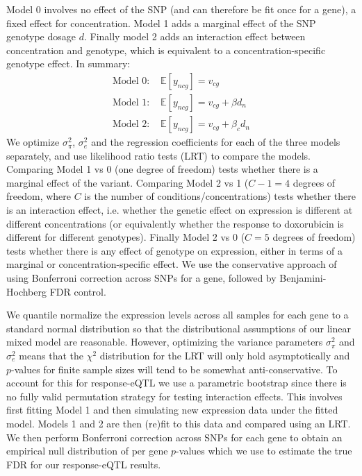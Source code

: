 \documentclass{article}
\begin{document}
{Model 0 involves no effect of the SNP (and can therefore be fit once for a gene), a fixed effect for concentration. Model 1 adds a marginal effect of the SNP genotype dosage $d$. Finally model 2 adds an interaction effect between concentration and genotype, which is equivalent to a concentration-specific genotype effect. In summary: 
\begin{align}
\text{Model 0: }& \mathbb{E}[ y_{ncg} ] = v_{cg} \\ 
\text{Model 1: }& \mathbb{E}[ y_{ncg} ] = v_{cg} + \beta d_n \\
\text{Model 2: }& \mathbb{E}[ y_{ncg} ] = v_{cg} + \beta_c d_n \label{eq:betac}
\end{align}
We optimize $\sigma^2_\pi$, $\sigma^2_e$ and the regression coefficients for each of the three models separately, and use likelihood ratio tests (LRT) to compare the models. Comparing Model 1 vs 0 (one degree of freedom) tests whether there is a marginal effect of the variant. Comparing Model 2 vs 1 ($C-1=4$ degrees of freedom, where $C$ is the number of conditions/concentrations) tests whether there is an interaction effect, i.e. whether the genetic effect on expression is different at different concentrations (or equivalently whether the response to doxorubicin is different for different genotypes). Finally Model 2 vs 0 ($C=5$ degrees of freedom) tests whether there is any effect of genotype on expression, either in terms of a marginal or concentration-specific effect. We use the conservative approach of using Bonferroni correction across SNPs for a gene, followed by Benjamini-Hochberg FDR control. 

We quantile normalize the expression levels across all samples for each gene to a standard normal distribution so that the distributional assumptions of our linear mixed model are reasonable. However, optimizing the variance parameters $\sigma^2_\pi$ and $\sigma^2_e$ means that the $\chi^2$ distribution for the LRT will only hold asymptotically and $p$-values for finite sample sizes will tend to be somewhat anti-conservative. To account for this for response-eQTL we use a parametric bootstrap since there is no fully valid permutation strategy for testing interaction effects. This involves first fitting Model 1 and then simulating new expression data under the fitted model. Models 1 and 2 are then (re)fit to this data and compared using an LRT. We then perform Bonferroni correction across SNPs for each gene to obtain an empirical null distribution of per gene $p$-values which we use to estimate the true FDR for our response-eQTL results. 

}
\end{document}
